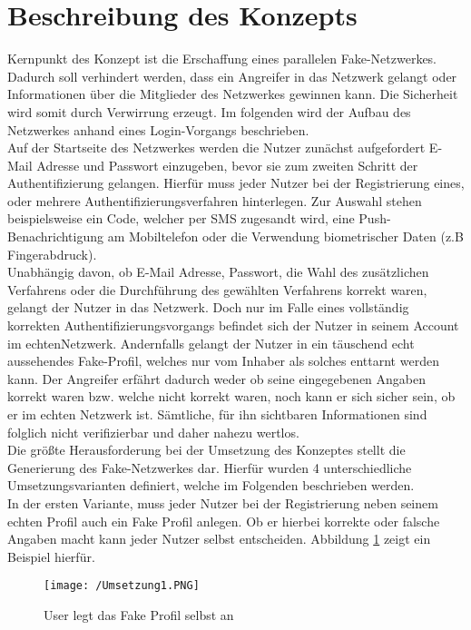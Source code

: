 \documentclass{sigchi}
\begin{document}
\section{Beschreibung des Konzepts}
\label{Konzept}
Kernpunkt des Konzept ist die Erschaffung eines parallelen Fake-Netzwerkes. Dadurch soll verhindert werden, dass ein Angreifer in das Netzwerk gelangt oder Informationen über die Mitglieder des Netzwerkes gewinnen kann. Die Sicherheit wird somit durch Verwirrung erzeugt. Im folgenden wird der Aufbau des Netzwerkes anhand eines Login-Vorgangs beschrieben. \\
Auf der Startseite des Netzwerkes werden die Nutzer zunächst aufgefordert E-Mail Adresse und Passwort einzugeben, bevor sie zum zweiten Schritt der Authentifizierung gelangen. Hierfür muss jeder Nutzer bei der Registrierung eines, oder mehrere Authentifizierungsverfahren hinterlegen. Zur Auswahl stehen beispielsweise ein Code, welcher per SMS zugesandt wird, eine Push-Benachrichtigung am Mobiltelefon oder die Verwendung biometrischer Daten (z.B Fingerabdruck).\\
Unabhängig davon, ob E-Mail Adresse, Passwort, die Wahl des zusätzlichen Verfahrens oder die Durchführung des gewählten Verfahrens korrekt waren, gelangt der Nutzer in das Netzwerk. Doch nur im Falle eines vollständig korrekten Authentifizierungsvorgangs befindet sich der Nutzer in seinem Account im \glqq echten\grqq Netzwerk. Andernfalls gelangt der Nutzer in ein täuschend echt aussehendes Fake-Profil, welches nur vom Inhaber als solches enttarnt werden kann.  Der Angreifer erfährt dadurch weder ob seine eingegebenen Angaben korrekt waren bzw. welche nicht korrekt waren, noch kann er sich sicher sein, ob er im echten Netzwerk ist. Sämtliche, für ihn sichtbaren Informationen sind folglich nicht verifizierbar und daher nahezu wertlos. \\
Die größte Herausforderung bei der Umsetzung des Konzeptes stellt die Generierung des Fake-Netzwerkes dar. Hierfür wurden 4 unterschiedliche Umsetzungsvarianten definiert, welche im Folgenden beschrieben werden. \\
In der ersten Variante, muss jeder Nutzer bei der Registrierung neben seinem echten Profil auch ein Fake Profil anlegen. Ob er hierbei korrekte oder falsche Angaben macht kann jeder Nutzer selbst entscheiden. Abbildung \ref{fig:Umsetzung1} zeigt ein Beispiel hierfür. 
\begin{figure}[htbp]
\texttt{[image: /Umsetzung1.PNG]}
\caption{User legt das Fake Profil selbst an}
\label{fig:Umsetzung1}
\end{figure}
\end{document}
